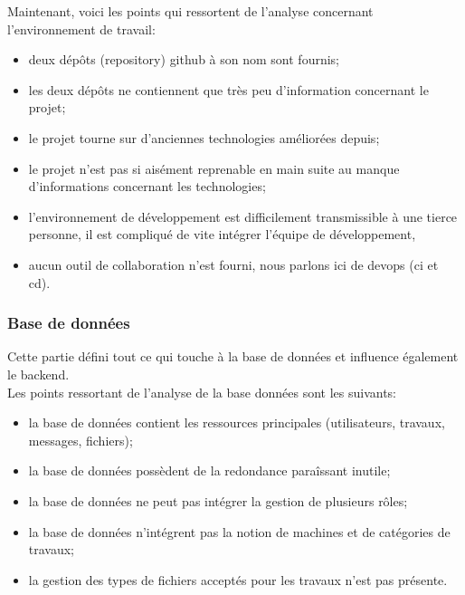 \documentclass[
    iai, %
    il, %
]{heig-tb}
\begin{document}
Maintenant, voici les points qui ressortent de l'analyse concernant l'environnement de travail:
\begin{itemize}
    \item deux dépôts (\Gls{repository}) \Gls{github} à son nom sont fournis;
    \item les deux dépôts ne contiennent que très peu d'information concernant le projet;
    \item le projet tourne sur d'anciennes technologies améliorées depuis;
    \item le projet n'est pas si aisément reprenable en main suite au manque d'informations concernant les technologies;
    \item l'environnement de développement est difficilement transmissible à une tierce personne, il est compliqué de vite intégrer l'équipe de développement,
    \item aucun outil de collaboration n'est fourni, nous parlons ici de \Gls{devops} (\Gls{ci} et \Gls{cd}).
\end{itemize}

\subsubsection{Base de données}
Cette partie défini tout ce qui touche à la base de données et influence également le \Gls{backend}.\\
Les points ressortant de l'analyse de la base données sont les suivants:
\begin{itemize}
    \item la base de données contient les ressources principales (utilisateurs, travaux, messages, fichiers);
    \item la base de données possèdent de la redondance paraîssant inutile;
    \item la base de données ne peut pas intégrer la gestion de plusieurs rôles;
    \item la base de données n'intégrent pas la notion de machines et de catégories de travaux;
    \item la gestion des types de fichiers acceptés pour les travaux n'est pas présente.
\end{itemize}

\newpage
\end{document}
